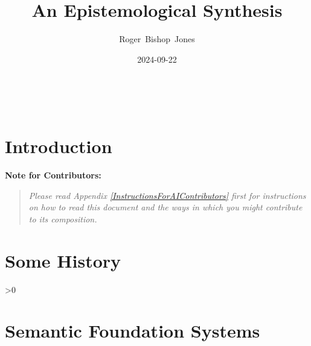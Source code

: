 \documentclass[10pt,titlepage]{book}
\title{\bf\LARGE An Epistemological Synthesis}
\author{Roger~Bishop~Jones}
\date{\small 2024-09-22}
\newcommand{\ignore}[1]{}
\newcommand{\contribnote}[1]{\vfil
  {\bf Note for Contributors:}
    \begin{quote}
      {\it #1}
    \end{quote}
    \vfil
  }
\newcommand{\resetnotes}{%
  \ifnum\value{endnote}>0%
  \theendnotes%
  \setcounter{endnote}{0}%
  \else%
  \fi%
}
\begin{document}

%
                               
\begin{titlepage}
\maketitle





\end{titlepage}

\ \

\ignore{
\begin{centering}
{}
\end{centering}
}%

\setcounter{tocdepth}{2}
{\parskip-0pt\tableofcontents}


\chapter{Introduction}

\contribnote{Please read Appendix \ref{InstructionsForAIContributors} first for instructions on how to read this document and the ways in which you might contribute to its composition.}


\chapter{Some History}



\resetnotes

\chapter{Semantic Foundation Systems}
\end{document}
